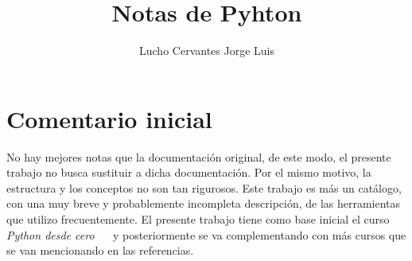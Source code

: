 \documentclass[10pt,oneside]{article}
\title{\textbf{Notas de Pyhton}}
\author{Lucho Cervantes Jorge Luis}
\begin{document}
 \maketitle 

\section{Comentario inicial}

    No hay mejores notas que la documentación original, de este modo, el presente trabajo no busca sustituir a dicha documentación. Por el mismo motivo, la estructura y los conceptos no son tan rigurosos. Este trabajo es más un catálogo, con una muy breve y probablemente incompleta descripción, de las herramientas que utilizo frecuentemente. El presente trabajo tiene como base inicial el curso \textit{Python desde cero}  ~\cite{Python0} y posteriormente se va complementando con más cursos que se van mencionando en las referencias. 
    
\end{document}
